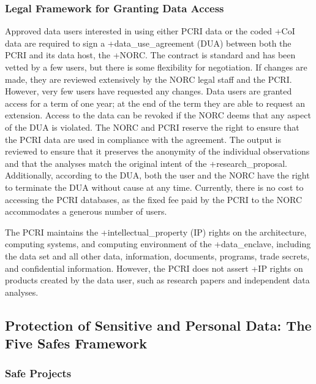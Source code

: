 \documentclass[
]{WileySix}
\begin{document}
\hypertarget{legal-framework-for-granting-data-access-3}{%
\subsubsection{Legal Framework for Granting Data Access}\label{legal-framework-for-granting-data-access-3}}

Approved data users interested in using either PCRI data or the coded +CoI\textbar{} data are required to sign a +data\_use\_agreement\textbar{} (DUA) between both the PCRI and its data host, the +NORC\textbar. The contract is standard and has been vetted by a few users, but there is some flexibility for negotiation. If changes are made, they are reviewed extensively by the NORC legal staff and the PCRI. However, very few users have requested any changes. Data users are granted access for a term of one year; at the end of the term they are able to request an extension. Access to the data can be revoked if the NORC deems that any aspect of the DUA is violated. The NORC and PCRI reserve the right to ensure that the PCRI data are used in compliance with the agreement. The output is reviewed to ensure that it preserves the anonymity of the individual observations and that the analyses match the original intent of the +research\_proposal\textbar. Additionally, according to the DUA, both the user and the NORC have the right to terminate the DUA without cause at any time. Currently, there is no cost to accessing the PCRI databases, as the fixed fee paid by the PCRI to the NORC accommodates a generous number of users.

The PCRI maintains the +intellectual\_property\textbar{} (IP) rights on the architecture, computing systems, and computing environment of the +data\_enclave\textbar, including the data set and all other data, information, documents, programs, trade secrets, and confidential information. However, the PCRI does not assert +IP\textbar{} rights on products created by the data user, such as research papers and independent data analyses.

\hypertarget{protection-of-sensitive-and-personal-data-the-five-safes-framework-3}{%
\subsection{Protection of Sensitive and Personal Data: The Five Safes Framework}\label{protection-of-sensitive-and-personal-data-the-five-safes-framework-3}}

\hypertarget{safe-projects-3}{%
\subsubsection{Safe Projects}\label{safe-projects-3}}
\end{document}
